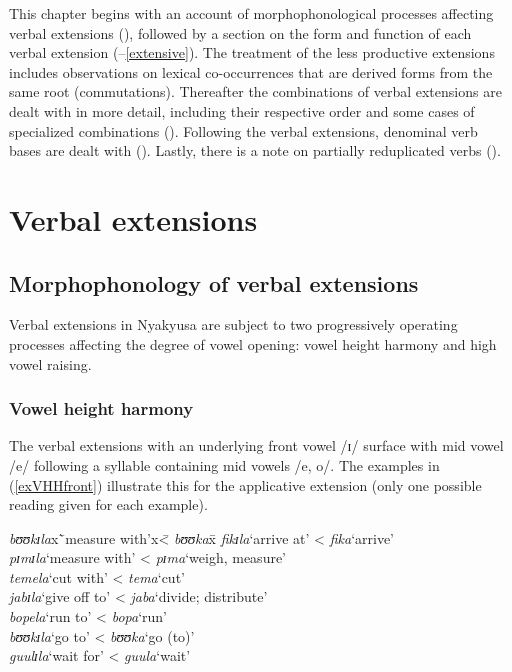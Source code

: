 This chapter begins with an account of morphophonological processes affecting verbal extensions (), followed by a section on the form and function of each verbal extension (--\ref{extensive}). The treatment of the less productive extensions includes observations on lexical co-occurrences that are derived forms from the same root (commutations). Thereafter the combinations of verbal extensions are dealt with in more detail, including their respective order and some cases of specialized combinations (). Following the verbal extensions, denominal verb bases are dealt with (). Lastly, there is a note on partially reduplicated verbs ().
\section{Verbal extensions}
\subsection{Morphophonology of verbal extensions}
\label{MorphophonologyOfVerbalExtension}
Verbal extensions in Nyakyusa are subject to two progressively operating processes affecting the degree of vowel opening: vowel height harmony and high vowel raising. 
\subsubsection{Vowel height harmony}\label{VowelHarmony} 
The verbal extensions with an underlying front vowel /ɪ/ surface with mid vowel /e/ following a syllable containing mid vowels /e, o/. 
The examples in (\ref{exVHHfront}) illustrate this for the applicative extension (only one possible reading given for each example).
\begin{exe}
\ex \label{exVHHfront}
\begin{tabbing}
\textit{bʊʊkɪla}x\=`measure with'x\= < \textit{bʊʊka}x\=\kill%
\textit{fikɪla}\>`arrive at'\> < \textit{fika}\>`arrive'\\
\textit{pɪmɪla}\>`measure with'\> < \textit{pɪma}\>`weigh, measure'\\
\textit{temela}\>`cut with'\> < \textit{tema}\>`cut' \\
\textit{jabɪla}\>`give off to'\> < \textit{jaba}\>\lq divide; distribute'\\
\textit{bopela}\>`run to'\> < \textit{bopa}\>`run'\\
\textit{bʊʊkɪla}\>`go to'\> < \textit{bʊʊka}\>`go (to)'\\
\textit{guulɪla}\>`wait for'\> < \textit{guula}\>`wait'
\end{tabbing}
\end{exe}

